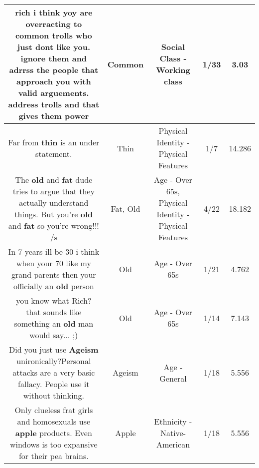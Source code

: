 \documentclass[11pt]{article}
\newlength\mylength
\begin{document}
\begin{center}
\begin{longtable}{|C{.65\mylength}|C{.30\mylength}|C{.12\mylength}|C{.12\mylength}|C{.12\mylength}|}
  \small rich i think yoy are overracting to \textbf{common} trolls who just dont like you. ignore them and adrrss the people that approach you with valid arguements. address trolls and that gives them power\normalsize   & Common & Social Class - Working class & 1/33 & 3.03 \\  \hline
  \small Far from \textbf{thin} is an under statement.\normalsize   & Thin & Physical Identity - Physical Features & 1/7 & 14.286 \\  \hline
  \small The \textbf{old} and \textbf{fat} dude tries to argue that they actually understand things. But you're \textbf{old} and \textbf{fat} so you're wrong!!! /s\normalsize   & Fat, Old & Age - Over 65s, Physical Identity - Physical Features & 4/22 & 18.182 \\  \hline
  \small In 7 years ill be 30 i think when your 70 like my grand parents then your officially an \textbf{old} person\normalsize   & Old & Age - Over 65s & 1/21 & 4.762 \\  \hline
  \small you know what Rich? that sounds like something an \textbf{old} man would say... ;)\normalsize   & Old & Age - Over 65s & 1/14 & 7.143 \\  \hline
  \small Did you just use \textbf{Ageism} unironically?Personal attacks are a very basic fallacy. People use it without thinking.\normalsize   & Ageism & Age - General & 1/18 & 5.556 \\  \hline
  \small Only clueless frat girls and homosexuals use \textbf{apple} products. Even windows is too expansive for their pea brains.\normalsize   & Apple & Ethnicity - Native-American & 1/18 & 5.556 \\  \hline

\end{longtable}
\end{center}
\end{document}
